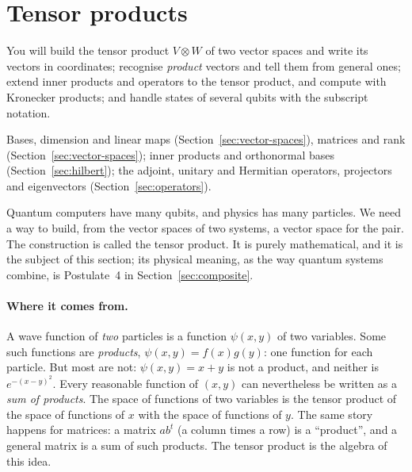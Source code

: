 \section{Tensor products}\label{sec:tensor}

\begin{objectives}
  You will build the tensor product $V\otimes W$ of two vector spaces and write its vectors in coordinates; recognise \emph{product} vectors and tell them from general ones; extend inner products and operators to the tensor product, and compute with Kronecker products; and handle states of several qubits with the subscript notation.
\end{objectives}

\begin{recall}
  Bases, dimension and linear maps (Section~\ref{sec:vector-spaces}), matrices and rank (Section~\ref{sec:vector-spaces}); inner products and orthonormal bases (Section~\ref{sec:hilbert}); the adjoint, unitary and Hermitian operators, projectors and eigenvectors (Section~\ref{sec:operators}).
\end{recall}

Quantum computers have many qubits, and physics has many particles. We need a way to build, from the vector spaces of two systems, a vector space for the pair. The construction is called the tensor product. It is purely mathematical, and it is the subject of this section; its physical meaning, as the way quantum systems combine, is Postulate~4 in Section~\ref{sec:composite}.

\paragraph{Where it comes from.}
A wave function of \emph{two} particles is a function $\psi(x,y)$ of two variables. Some such functions are \emph{products}, $\psi(x,y)=f(x)g(y)$: one function for each particle. But most are not: $\psi(x,y)=x+y$ is not a product, and neither is $e^{-(x-y)^2}$. Every reasonable function of $(x,y)$ can nevertheless be written as a \emph{sum of products}. The space of functions of two variables is the tensor product of the space of functions of $x$ with the space of functions of $y$. The same story happens for matrices: a matrix $ab^t$ (a column times a row) is a ``product'', and a general matrix is a sum of such products. The tensor product is the algebra of this idea.

